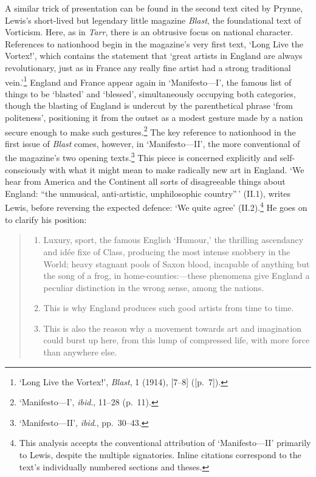 \documentclass[]{article}
\providecommand{\tightlist}{%
  \setlength{\itemsep}{0pt}\setlength{\parskip}{0pt}}
\begin{document}
A similar trick of presentation can be found in the second text cited by
Prynne, Lewis's short-lived but legendary little magazine \emph{Blast},
the foundational text of Vorticism. Here, as in \emph{Tarr}, there is an
obtrusive focus on national character. References to nationhood begin in
the magazine's very first text, `Long Live the Vortex!', which contains
the statement that `great artists in England are always revolutionary,
just as in France any really fine artist had a strong traditional
vein.'\footnote{`Long Live the Vortex!', \emph{Blast}, 1 (1914),
  {[}7--8{]} ({[}p.~7{]}).} England and France appear again in
`Manifesto---I', the famous list of things to be `blasted' and
`blessed', simultaneously occupying both categories, though the blasting
of England is undercut by the parenthetical phrase `from politeness',
positioning it from the outset as a modest gesture made by a nation
secure enough to make such gestures.\footnote{`Manifesto---I',
  \emph{ibid}., 11--28 (p.~11).} The key reference to nationhood in the
first issue of \emph{Blast} comes, however, in `Manifesto---II', the
more conventional of the magazine's two opening texts.\footnote{`Manifesto---II',
  \emph{ibid}., pp.~30--43.} This piece is concerned explicitly and
self-consciously with what it might mean to make radically new art in
England. `We hear from America and the Continent all sorts of
disagreeable things about England: ``the unmusical, anti-artistic,
unphilosophic country''\,' (II.1), writes Lewis, before reversing the
expected defence: `We quite agree' (II.2).\footnote{This analysis
  accepts the conventional attribution of `Manifesto---II' primarily to
  Lewis, despite the multiple signatories. Inline citations correspond
  to the text's individually numbered sections and theses.} He goes on
to clarify his position:

\begin{quote}
\begin{enumerate}
\def\labelenumi{\arabic{enumi}.}
\setcounter{enumi}{2}
\tightlist
\item
  Luxury, sport, the famous English `Humour,' the thrilling ascendancy
  and idée fixe of Class, producing the most intense snobbery in the
  World; heavy stagnant pools of Saxon blood, incapable of anything but
  the song of a frog, in home-counties:---these phenomena give England a
  peculiar distinction in the wrong sense, among the nations.
\item
  This is why England produces such good artists from time to time.
\item
  This is also the reason why a movement towards art and imagination
  could burst up here, from this lump of compressed life, with more
  force than anywhere else.
\end{enumerate}
\end{quote}
\end{document}

